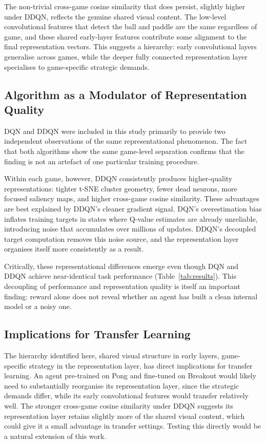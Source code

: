 \documentclass[a4paper]{article}
\begin{document}
The non-trivial cross-game cosine similarity that does persist, slightly higher under DDQN, reflects the genuine shared visual content. The low-level convolutional features that detect the ball and paddle are the same regardless of game, and these shared early-layer features contribute some alignment to the final representation vectors. This suggests a hierarchy: early convolutional layers generalise across games, while the deeper fully connected representation layer specialises to game-specific strategic demands.

\subsection{Algorithm as a Modulator of Representation Quality}

DQN and DDQN were included in this study primarily to provide two independent observations of the same representational phenomenon. The fact that both algorithms show the same game-level separation confirms that the finding is not an artefact of one particular training procedure.

Within each game, however, DDQN consistently produces higher-quality representations: tighter t-SNE cluster geometry, fewer dead neurons, more focused saliency maps, and higher cross-game cosine similarity. These advantages are best explained by DDQN's cleaner gradient signal. DQN's overestimation bias inflates training targets in states where Q-value estimates are already unreliable, introducing noise that accumulates over millions of updates. DDQN's decoupled target computation removes this noise source, and the representation layer organises itself more consistently as a result.

Critically, these representational differences emerge even though DQN and DDQN achieve near-identical task performance (Table~\ref{tab:results}). This decoupling of performance and representation quality is itself an important finding: reward alone does not reveal whether an agent has built a clean internal model or a noisy one.

\subsection{Implications for Transfer Learning}

The hierarchy identified here, shared visual structure in early layers, game-specific strategy in the representation layer, has direct implications for transfer learning. An agent pre-trained on Pong and fine-tuned on Breakout would likely need to substantially reorganise its representation layer, since the strategic demands differ, while its early convolutional features would transfer relatively well. The stronger cross-game cosine similarity under DDQN suggests its representation layer retains slightly more of the shared visual content, which could give it a small advantage in transfer settings. Testing this directly would be a natural extension of this work.
\end{document}
